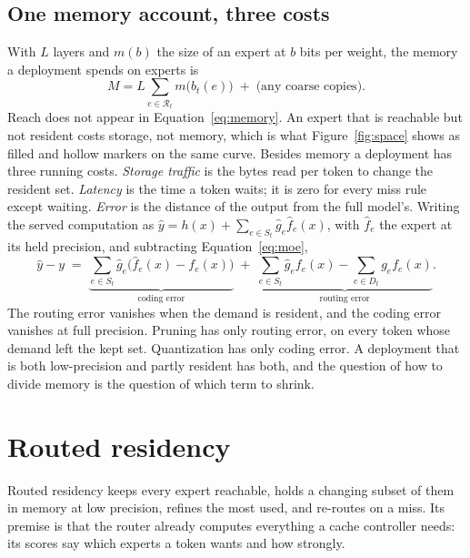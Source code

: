 \documentclass[11pt]{article}
\newcommand{\res}{\mathcal{R}}
\begin{document}
\subsection{One memory account, three costs}

With $L$ layers and $m(b)$ the size of an expert at $b$ bits per weight, the memory a deployment
spends on experts is
\begin{equation}
  M = L\sum_{e\in\res_t} m\bigl(b_t(e)\bigr) \;+\; \text{(any coarse copies)}.
  \label{eq:memory}
\end{equation}
Reach does not appear in Equation~\ref{eq:memory}. An expert that is reachable but not
resident costs storage, not memory, which is what Figure~\ref{fig:space} shows as filled and
hollow markers on the same curve. Besides memory a deployment has three running costs.
\emph{Storage traffic} is the bytes read per token to change the resident set.
\emph{Latency} is the time a token waits; it is zero for every miss rule except waiting.
\emph{Error} is the distance of the output from the full model's. Writing the served
computation as $\hat y=h(x)+\sum_{e\in S_t}\hat g_e\hat f_e(x)$, with $\hat f_e$ the expert at
its held precision, and subtracting Equation~\ref{eq:moe},
\begin{equation}
  \hat y-y \;=\;
  \underbrace{\sum_{e\in S_t}\hat g_e\bigl(\hat f_e(x)-f_e(x)\bigr)}_{\text{coding error}}
  \;+\;
  \underbrace{\sum_{e\in S_t}\hat g_e f_e(x)-\sum_{e\in D_t} g_e f_e(x)}_{\text{routing error}} .
  \label{eq:error}
\end{equation}
The routing error vanishes when the demand is resident, and the coding error vanishes at full
precision. Pruning has only routing error, on every token whose demand left the kept set.
Quantization has only coding error. A deployment that is both low-precision and partly resident
has both, and the question of how to divide memory is the question of which term to shrink.

\FloatBarrier
\section{Routed residency}
\label{sec:method}

Routed residency keeps every expert reachable, holds a changing subset of them in memory at low precision, refines the most used, and re-routes on a miss. Its premise is that the router already computes everything a cache controller needs: its scores say which experts a token wants and how strongly.
\end{document}
